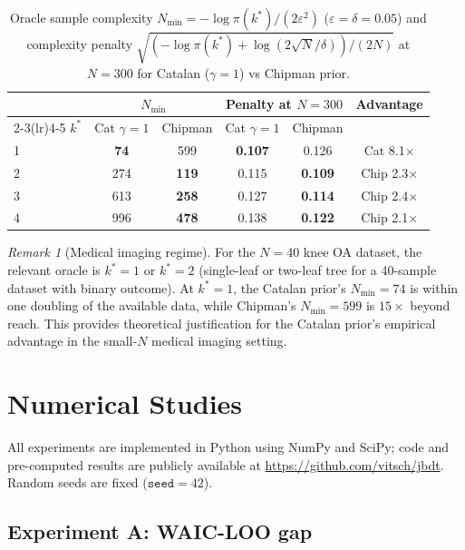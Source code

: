 \documentclass[ba]{imsart}
\theoremstyle{plain}
\theoremstyle{definition}
\theoremstyle{remark}
\newtheorem{remark}[theorem]{Remark}
\newcommand{\Nmin}{N_{\min}}
\begin{document}
\begin{table}[t]
\centering
\caption{Oracle sample complexity $\Nmin = -\log\pi(k^*) / (2\varepsilon^2)$
  ($\varepsilon=\delta=0.05$) and complexity penalty
  $\sqrt{(-\log\pi(k^*)+\log(2\sqrt{N}/\delta))/(2N)}$
  at $N=300$ for Catalan ($\gamma=1$) vs Chipman prior.}
\label{tab:pacbayes}
\begin{tabular}{lccccc}
\toprule
& \multicolumn{2}{c}{$\Nmin$} & \multicolumn{2}{c}{Penalty at $N=300$} & Advantage \\
\cmidrule(lr){2-3}\cmidrule(lr){4-5}
$k^*$ & Cat $\gamma=1$ & Chipman & Cat $\gamma=1$ & Chipman & \\
\midrule
1 & \textbf{74}  & 599 & \textbf{0.107} & 0.126 & Cat 8.1$\times$ \\
2 & 274 & \textbf{119} & 0.115 & \textbf{0.109} & Chip 2.3$\times$ \\
3 & 613 & \textbf{258} & 0.127 & \textbf{0.114} & Chip 2.4$\times$ \\
4 & 996 & \textbf{478} & 0.138 & \textbf{0.122} & Chip 2.1$\times$ \\
\bottomrule
\end{tabular}
\end{table}

\begin{remark}[Medical imaging regime]
For the $N=40$ knee OA dataset, the relevant oracle is $k^*=1$ or $k^*=2$
(single-leaf or two-leaf tree for a 40-sample dataset with binary outcome).
At $k^*=1$, the Catalan prior's $\Nmin=74$ is within one doubling of the
available data, while Chipman's $\Nmin=599$ is $15\times$ beyond reach.
This provides theoretical justification for the Catalan prior's empirical
advantage in the small-$N$ medical imaging setting.
\end{remark}

\section{Numerical Studies}
\label{sec:experiments}

All experiments are implemented in Python using NumPy and SciPy;
code and pre-computed results are publicly available at \url{https://github.com/vitsch/jbdt}.
Random seeds are fixed ($\texttt{seed}=42$).

\subsection{Experiment A: WAIC-LOO gap}
\end{document}
